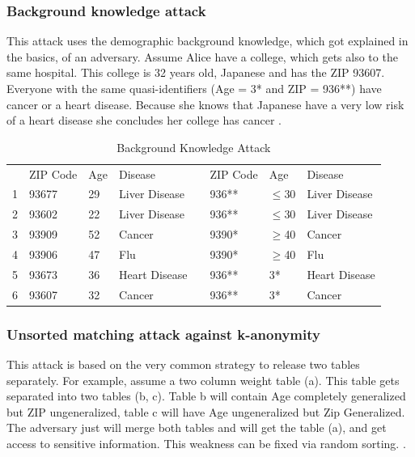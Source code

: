 \documentclass{llncs}
\begin{document}
\subsubsection{Background knowledge attack}
This attack uses the demographic background knowledge, which got explained in the basics, of an adversary. Assume Alice have a college, which gets also to the same hospital. This college is 32 years old, Japanese and has the ZIP 93607. Everyone with the same quasi-identifiers (Age = 3* and ZIP = 936**) have cancer or a heart disease. Because she knows that Japanese have a very low risk of a heart disease she concludes her college has cancer \cite{ldiversity}.
\begin{table}[]
	\centering
	\caption{Background Knowledge Attack}
	\label{tablebackground}
	\begin{tabular}{@{}llllllll@{}}
		\cmidrule(r){1-4} \cmidrule(l){6-8}
		& ZIP Code & Age & Disease        &  & ZIP Code & Age      & Disease        \\ \cmidrule(r){1-4} \cmidrule(l){6-8} 
		1 & 93677    & 29  & Liver Disease   &  & 936**    & $\leq$30 & Liver Disease   \\
		2 & 93602    & 22  & Liver Disease   &  & 936**    & $\leq$30 & Liver Disease   \\
		3 & 93909    & 52  & Cancer         &  & 9390*    & $\geq$40 & Cancer         \\
		4 & 93906    & 47  & Flu            &  & 9390*    & $\geq$40 & Flu            \\
		5 & 93673    & 36  & Heart Disease &  & 936**    & 3*       & Heart Disease \\
		6 & 93607    & 32  & Cancer         &  & 936**    & 3*       & Cancer         \\ \cmidrule(r){1-4} \cmidrule(l){6-8} 
	\end{tabular}
\end{table}

\subsubsection{Unsorted matching attack against k-anonymity}
This attack is based on the very common strategy to release two tables separately. For example, assume a two column weight table (a). This table gets separated into two tables (b, c). Table b will contain Age completely generalized but ZIP ungeneralized, table c will have Age ungeneralized but Zip Generalized. The adversary just will merge both tables and will get the table (a), and get access to sensitive information. This weakness can be fixed via random sorting. \cite{sweeney2002k}.
\end{document}
